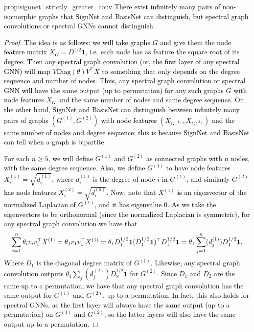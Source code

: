 \documentclass{article} \usepackage{iclr2023_conference,times}
\newcommand{\rebut}[1]{\textcolor{black}{#1}}
\begin{document}
\begin{repproposition}{prop:signnet_strictly_greater_conv}
\rebut{There exist infinitely many pairs of non-isomorphic graphs that SignNet and BasisNet can distinguish, but spectral graph convolutions or spectral GNNs cannot distinguish.}
\end{repproposition}
\begin{proof}
    \rebut{
    The idea is as follows: we will take graphs $G$ and give them the node feature matrix $X_G = D^{1/2}\mathbf{1}$, i.e. each node has as feature the square root of its degree. Then any spectral graph convolution (or, the first layer of any spectral GNN) will map $V\mathrm{Diag}(\theta)V^\top X$ to something that only depends on the degree sequence and number of nodes. Thus, any spectral graph convolution or spectral GNN will have the same output (up to permutation) for any such graphs $G$ with node features $X_G$ and the same number of nodes and same degree sequence. On the other hand, SignNet and BasisNet can distinguish between infinitely many pairs of graphs $(G^{(1)}, G^{(2)})$ with node features $(X_{G^{(1)}}, X_{G^{(2)}})$ and the same number of nodes and degree sequence; this is because SignNet and BasisNet can tell when a graph is bipartite.
    }
    
    \rebut{For each $n \geq 5$, we will define $G^{(1)}$ and $G^{(2)}$ as connected graphs with $n$ nodes, with the same degree sequence. Also, we define $G^{(1)}$ to have node features $X^{(1)}_i = \sqrt{d_i^{(1)}}$, where $d_i^{(1)}$ is the degree of node $i$ in $G^{(1)}$, and similarly $G^{(2)}$ has node features $X^{(2)}_i = \sqrt{d_i^{(2)}}$. Now, note that $X^{(1)}$ is an eigenvector of the normalized Laplacian of $G^{(1)}$, and it has eigenvalue $0$. As we take the eigenvectors to be orthonormal (since the normalized Laplacian is symmetric), for any spectral graph convolution we have that}
    \begin{equation}
        \rebut{ \sum_{i=1}^n \theta_i v_i v_i^\top X^{(1)} =  \theta_1 v_1 v_1^\top X^{(1)} = \theta_1 D_1^{1/2}\mathbf{1} (D_1^{1/2}\mathbf{1})^\top D_1^{1/2}\mathbf{1} = \theta_1 \sum_{j=1}^n (d_j^{(1)}) D_1^{1/2}\mathbf{1}. }
    \end{equation}
    \rebut{Where $D_1$ is the diagonal degree matrix of $G^{(1)}$. Likewise, any spectral graph convolution outputs $\theta_1 \sum_j (d_j^{(2)}) D_2^{1/2} \mathbf{1}$ for $G^{(2)}$. Since $D_1$ and $D_2$ are the same up to a permutation, we have that any spectral graph convolution has the same output for $G^{(1)}$ and $G^{(2)}$, up to a permutation. In fact, this also holds for spectral GNNs, as the first layer will always have the same output (up to a permutation) on $G^{(1)}$ and $G^{(2)}$, so the latter layers will also have the same output up to a permutation.}


\end{proof}
\end{document}
